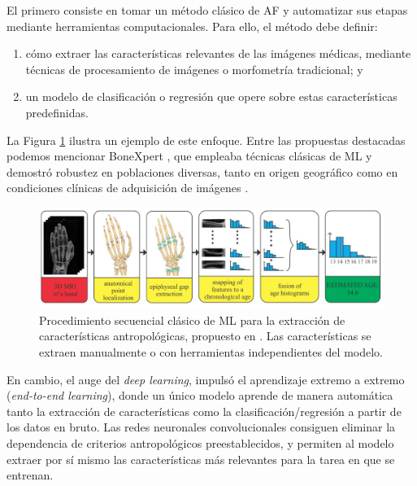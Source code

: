 El primero consiste en tomar un método clásico de \acrshort{AF} y automatizar sus etapas mediante herramientas computacionales. Para ello, el método debe definir:

\begin{enumerate}
    
    \item cómo extraer las características relevantes de las imágenes médicas, mediante técnicas de procesamiento de imágenes o morfometría tradicional; y

    \item un modelo de clasificación o regresión que opere sobre estas características predefinidas.

\end{enumerate}

La Figura \ref{fig:MRI_pipeline} ilustra un ejemplo de este enfoque. Entre las propuestas destacadas podemos mencionar BoneXpert \cite{thodberg2008}, que empleaba técnicas clásicas de \acrshort{ML} y demostró robustez en poblaciones diversas, tanto en origen geográfico como en condiciones clínicas de adquisición de imágenes \cite{van2009, martin2010, thodberg2010}. 

\begin{figure}[htbp]
    \centering
    \includegraphics[width=\textwidth]{capitulos/cap_01/imagenes/MRI_pipeline.png}
    \caption[
        Procedimiento secuencial clásico de \textit{machine learning} para la extracción de características antropológicas.
    ]{
        Procedimiento secuencial clásico de \acrshort{ML} para la extracción de características antropológicas, propuesto en \cite{stern2014}. 
        Las características se extraen manualmente o con herramientas independientes del modelo.
    }
    \label{fig:MRI_pipeline}
\end{figure}

En cambio, el auge del \textit{deep learning}, impulsó el aprendizaje extremo a extremo (\textit{end-to-end learning}), donde un único modelo aprende de manera automática tanto la extracción de características como la clasificación/regresión a partir de los datos en bruto. Las redes neuronales convolucionales consiguen eliminar la dependencia de criterios antropológicos preestablecidos, y permiten al modelo extraer por sí mismo las características más relevantes para la tarea en que se entrenan. 

